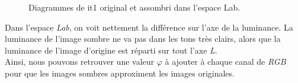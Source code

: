 \documentclass[a4paper,11pt]{article}
\begin{document}
\begin{figure}[H]
  \begin{center}  
    \caption{Diagrammes de it1 original et assombri dans l'espace Lab.}
  \end{center}
\end{figure}

Dans l'espace \textit{Lab}, on voit nettement la différence sur l'axe 
de la luminance. La luminance de l'image sombre ne va pas dans les 
tons très clairs, alors que la luminance de l'image d'origine est 
réparti sur tout l'axe \textit{L}.\\

Ainsi, nous pouvons retrouver une valeur $\varphi$ à ajouter à chaque 
canal de \textit{RGB} pour que les images sombres approximent les images
originales.
\end{document}
